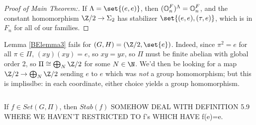 \documentclass{report}
\begin{document}
\begin{appendices}
\begin{proof}[Proof of Main Theorem:]
If $\Lambda = \set{(e,e)}$, then $(\text{$\mathbb{O}$}^F_n)^\Lambda = \text{$\mathbb{O}$}^F_n$, and the constant homomorphism $\Z/2\to \Sigma_2$ has stabilizer $\set{(e,e),(\tau,e)}$, which is in $F_n$ for all of our families.   
\end{proof}


\begin{remark}
  Lemma \ref{BElemma3} fails for $(G,H) = (\Z/2,\set{e})$. Indeed, since $\pi^2 = e$ for all $\pi\in \Pi$, $(xy)(xy) = e$, so $xy = yx$, so $\Pi$ must be finite abelian with global order 2, so $\Pi\cong\bigoplus_N\Z/2$ for some $N\in\N$. We'd then be looking for a map $\Z/2\to \bigoplus_N\Z/2$ sending $e$ to $e$ which was {\em not} a group homomorphism; but this is implisslbe: in each coordinate, either choice yields a group homomorphism.
\end{remark}
$ $\\

$ $\\

\begin{lemma}
 If $f\in Set(G,\Pi)$, then $Stab(f)$ SOMEHOW DEAL WITH DEFINITION 5.9 WHERE WE HAVEN'T RESTRICTED TO f's WHICH HAVE f(e)=e. 
\end{lemma}



\end{appendices}






\end{document}
